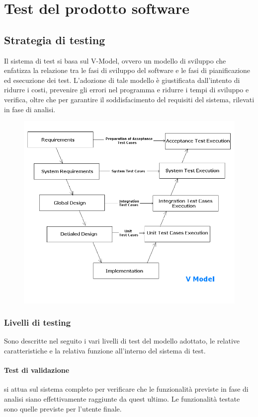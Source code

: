 \documentclass[12pt,a4paper]{article}
\begin{document}
\newpage

\section{Test del prodotto software}\label{test}
\subsection{Strategia di testing}\label{test_strategia}
Il sistema di test si basa sul V-Model, ovvero un modello di sviluppo che enfatizza la relazione tra le fasi di sviluppo del software e le fasi di pianificazione ed esecuzione dei test. L'adozione di tale modello è giustificata dall'intento di ridurre i costi, prevenire gli errori nel programma e ridurre i tempi di sviluppo e verifica, oltre che per garantire il soddisfacimento del requisiti del sistema, rilevati in fase di analisi.
\begin{figure}[h]
\centering
\includegraphics[width=0.9\linewidth]{../img/v-model}
\caption[V Model]{}
\label{fig:v-model}
\end{figure}

\subsubsection{Livelli di testing}
Sono descritte nel seguito i vari livelli di test del modello adottato, le relative caratteristiche e la relativa funzione all'interno del sistema di test. 
	\paragraph{Test di validazione} si attua sul sistema completo per verificare che le funzionalità previste in fase di analisi siano effettivamente raggiunte da quest ultimo. Le funzionalità testate sono quelle previste per l'utente finale.
\end{document}
